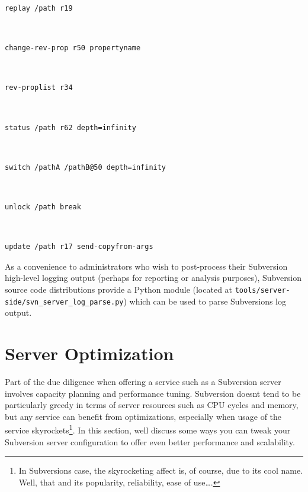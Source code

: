 \begin{description}
\begin{verbatim}
replay /path r19
\end{verbatim}
\item[Revision property change] ~ 
\begin{verbatim}
change-rev-prop r50 propertyname
\end{verbatim}
\item[Revision property list] ~ 
\begin{verbatim}
rev-proplist r34
\end{verbatim}
\item[Status] ~ 
\begin{verbatim}
status /path r62 depth=infinity
\end{verbatim}
\item[Switch] ~ 
\begin{verbatim}
switch /pathA /pathB@50 depth=infinity
\end{verbatim}
\item[Unlock] ~ 
\begin{verbatim}
unlock /path break
\end{verbatim}
\item[Update] ~ 
\begin{verbatim}
update /path r17 send-copyfrom-args
\end{verbatim}
\end{description}

As a convenience to administrators who wish to post-process their
Subversion high-level logging output (perhaps for reporting or analysis
purposes), Subversion source code distributions provide a Python module
(located at \texttt{tools/server-side/svn\_server\_log\_parse.py}) which
can be used to parse Subversion\textquotesingle s log output.

\section{Server Optimization}\label{svn.serverconfig.optimization}

Part of the due diligence when offering a service such as a Subversion
server involves capacity planning and performance tuning. Subversion
doesn\textquotesingle t tend to be particularly greedy in terms of
server resources such as CPU cycles and memory, but any service can
benefit from optimizations, especially when usage of the service
skyrockets\footnote{In Subversion\textquotesingle s case, the
  skyrocketing affect is, of course, due to its cool name. Well, that
  and its popularity, reliability, ease of use\ldots.}. In this section,
we\textquotesingle ll discuss some ways you can tweak your Subversion
server configuration to offer even better performance and scalability.

